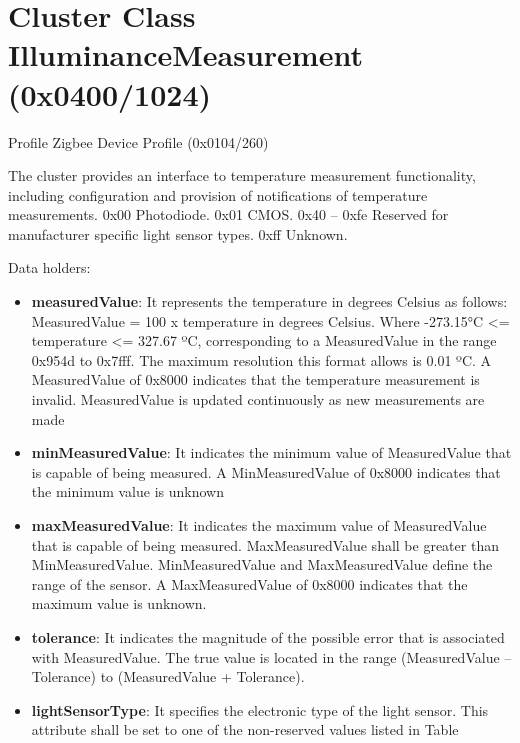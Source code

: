 \section{Cluster Class IlluminanceMeasurement (0x0400/1024)}

Profile Zigbee Device Profile (0x0104/260)

The cluster provides an interface to temperature measurement functionality, including configuration and provision of notifications of temperature measurements. 0x00 Photodiode. 0x01 CMOS. 0x40 – 0xfe Reserved for manufacturer specific light sensor types. 0xff Unknown.
\newline

\noindent
Data holders:

\begin{itemize}
\item \textbf{measuredValue}: It represents the temperature in degrees Celsius as follows: MeasuredValue = 100 x temperature in degrees Celsius. Where -273.15°C <= temperature <= 327.67 ºC, corresponding to a MeasuredValue in the range 0x954d to 0x7fff. The maximum resolution this format allows is 0.01 ºC. A MeasuredValue of 0x8000 indicates that the temperature measurement is invalid. MeasuredValue is updated continuously as new measurements are made	
\item \textbf{minMeasuredValue}: It indicates the minimum value of MeasuredValue that is capable of being measured. A MinMeasuredValue of 0x8000 indicates that the minimum value is unknown		
\item \textbf{maxMeasuredValue}: It indicates the maximum value of MeasuredValue that is capable of being measured. MaxMeasuredValue shall be greater than MinMeasuredValue. MinMeasuredValue and MaxMeasuredValue define the range of the sensor. A MaxMeasuredValue of 0x8000 indicates that the maximum value is unknown.	
\item \textbf{tolerance}: It indicates the magnitude of the possible error that is associated with MeasuredValue. The true value is located in the range (MeasuredValue – Tolerance) to (MeasuredValue + Tolerance).
\item \textbf{lightSensorType}: It  specifies the electronic type of the light sensor. This attribute shall be set to one of the non-reserved values listed in Table
\end{itemize}

